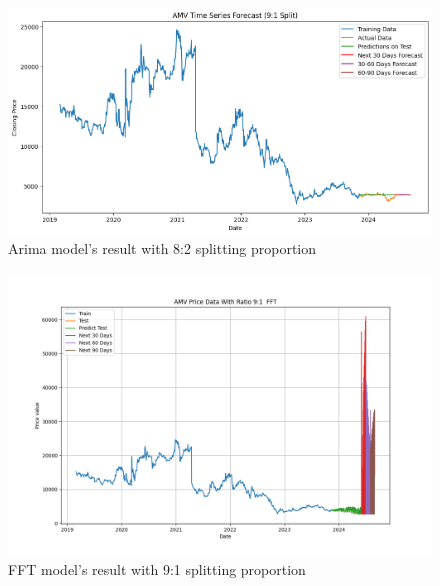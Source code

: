 \documentclass{ieeeojies}
\begin{document}
\vspace{-1em}

\begin{figure}[H]
  \centering
  \begin{minipage}{0.8\linewidth}
    \centering
    \includegraphics[width=\linewidth]{bibliography/Figure/AMV_ARIMA.png}
    \caption{Arima model's result with 8:2 splitting proportion}
    \label{fig8}
  \end{minipage}
\end{figure}

\vspace{-1em}

\begin{figure}[H]
  \centering
  \begin{minipage}{0.8\linewidth}
    \centering
    \includegraphics[width=\linewidth]{bibliography/Figure/FFT_91_AMV.png}
    \caption{FFT model's result with 9:1 splitting proportion}
    \label{fig8}
  \end{minipage}
\end{figure}
\end{document}
